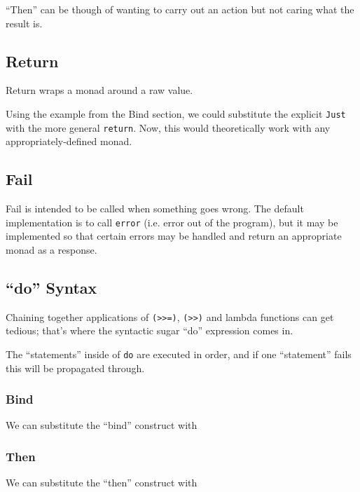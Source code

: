 ``Then'' can be though of wanting to carry out an action but not caring what the result is.

\subsection{Return}

Return wraps a monad around a raw value.

Using the example from the Bind section, we could substitute the explicit \texttt{Just} with the more general \texttt{return}. Now, this would theoretically work with any appropriately-defined monad.


\subsection{Fail}

Fail is intended to be called when something goes wrong. The default implementation is to call \texttt{error} (i.e. error out of the program), but it may be implemented so that certain errors may be handled and return an appropriate monad as a response.

\subsection{``do'' Syntax}

Chaining together applications of \texttt{(>>=)}, \texttt{(>>)} and lambda functions can get tedious; that's where the syntactic sugar ``do'' expression comes in.

The ``statements'' inside of \texttt{do} are executed in order, and if one ``statement'' fails this will be propagated through.

\subsubsection{Bind}
We can substitute the ``bind'' construct
with

\subsubsection{Then}
We can substitute the ``then'' construct
with


